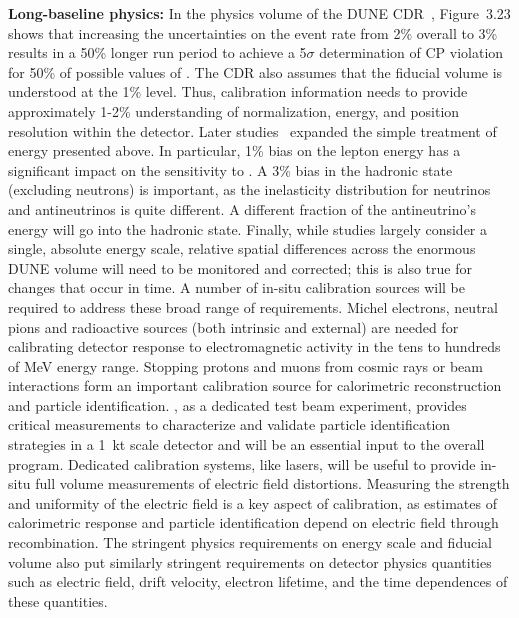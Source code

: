 \textbf{Long-baseline physics:} In the physics volume of the DUNE CDR~\cite{Acciarri:2015uup}, Figure~3.23 shows that increasing the uncertainties on the \nue event rate from \num{2}\% overall 
to \num{3}\% results in a \num{50}\% longer run period to achieve a 5$\sigma$ determination of CP violation for 50\% of possible values of . The CDR also assumes that the fiducial volume is understood at the 1\% level. Thus, calibration information needs to provide approximately 1-2\% understanding of normalization, energy, and position resolution within the detector. Later studies~\cite{ebias} expanded the simple treatment of energy  presented above. In particular, \num{1}\% bias on the lepton energy has a significant impact on the sensitivity to . 
A \num{3}\% bias in the hadronic state (excluding neutrons) is important, as the inelasticity  distribution for neutrinos and antineutrinos is quite different.  A different fraction of the antineutrino's energy will go into the hadronic state. Finally, while studies largely consider a single, absolute energy scale, relative spatial differences across the enormous DUNE  volume will need to be monitored and corrected; this is also true for changes that occur in time. A number of in-situ calibration sources will be required to address these broad range of requirements. Michel electrons, neutral pions and radioactive sources (both intrinsic and external) are needed for calibrating detector response to electromagnetic activity in the tens to hundreds of MeV energy range. Stopping protons and muons from cosmic rays or beam interactions form an important calibration source for calorimetric reconstruction and particle identification. , as a dedicated test beam experiment, provides critical measurements to characterize and validate particle identification strategies in a 1~kt scale detector and will be an essential input to the overall program. Dedicated calibration systems, like lasers, will be useful to provide in-situ full volume measurements of electric field distortions. Measuring the strength and uniformity of the electric field is a key aspect of calibration, as  estimates of calorimetric response and particle identification depend on electric field through recombination. The stringent physics requirements on energy scale and fiducial volume also put similarly stringent requirements on detector physics quantities such as electric field, drift velocity, electron lifetime, and the time dependences of these quantities.

